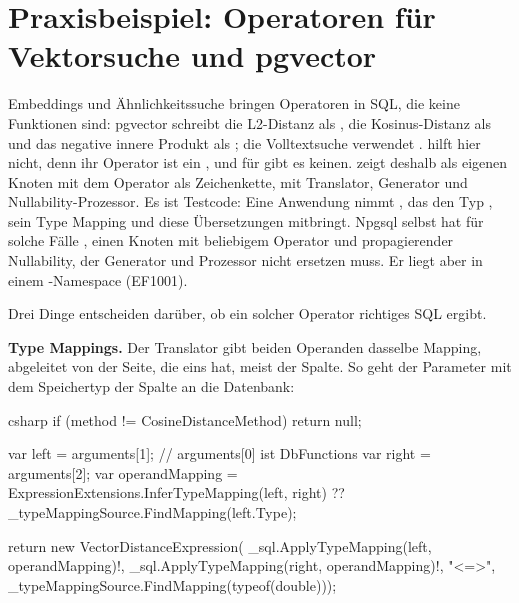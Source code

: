 \section{Praxisbeispiel: Operatoren für Vektorsuche und pgvector}

Embeddings und Ähnlichkeitssuche bringen Operatoren in SQL, die keine Funktionen sind: pgvector
schreibt die L2-Distanz als \code{<->}, die Kosinus-Distanz als
\code{<=>} und das negative innere Produkt als
\code{<\#>}; die Volltextsuche verwendet .
 hilft hier nicht, denn ihr Operator ist
ein , und für \code{<=>} gibt es
keinen.  zeigt deshalb
 als eigenen Knoten  mit dem
Operator als Zeichenkette, mit Translator, Generator und Nullability-Prozessor. Es ist
Testcode: Eine Anwendung nimmt ,
das den Typ , sein Type Mapping und diese Übersetzungen mitbringt. Npgsql selbst
hat für solche Fälle ,
einen Knoten mit beliebigem Operator und propagierender Nullability, der Generator und
Prozessor nicht ersetzen muss. Er liegt aber in einem -Namespace (EF1001).

Drei Dinge entscheiden darüber, ob ein solcher Operator richtiges SQL ergibt.

\textbf{Type Mappings.} Der Translator gibt beiden Operanden dasselbe Mapping, abgeleitet von
der Seite, die eins hat, meist der Spalte. So geht der Parameter mit dem Speichertyp der Spalte
an die Datenbank:

\begin{sourcecode}{csharp}
if (method != CosineDistanceMethod)
    return null;

var left = arguments[1];                        // arguments[0] ist DbFunctions
var right = arguments[2];
var operandMapping = ExpressionExtensions.InferTypeMapping(left, right)
                     ?? _typeMappingSource.FindMapping(left.Type);

return new VectorDistanceExpression(
    _sql.ApplyTypeMapping(left, operandMapping)!,
    _sql.ApplyTypeMapping(right, operandMapping)!,
    "<=>",
    _typeMappingSource.FindMapping(typeof(double)));
\end{sourcecode}

